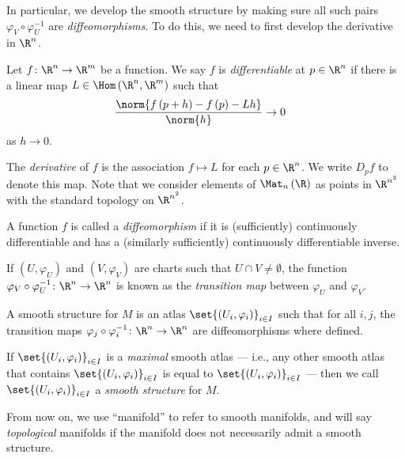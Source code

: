 \documentclass[10pt]{mypackage}
\begin{document}
In particular, we develop the smooth structure by making sure all such pairs $\varphi_{V}\circ\varphi_U^{-1}$ are \textit{diffeomorphisms}. To do this, we need to first develop the derivative in $\R^n$.
\begin{definition}
  Let $f\colon \R^n\rightarrow \R^m$ be a function. We say $f$ is \textit{differentiable} at $p\in \R^n$ if there is a linear map $L\in \Hom\left( \R^n,\R^m \right)$ such that
  \begin{align*}
    \frac{\norm{f\left( p+h \right)-f\left( p \right)-Lh}}{\norm{h}} &\rightarrow 0
  \end{align*}
  as $h\rightarrow 0$.\newline

  The \textit{derivative} of $f$ is the association $f\mapsto L$ for each $p\in \R^n$. We write $D_pf$ to denote this map. Note that we consider elements of $\Mat_{n}\left( \R \right)$ as points in $\R^{n^2}$ with the standard topology on $\R^{n^2}$.\newline

  A function $f$ is called a \textit{diffeomorphism} if it is (sufficiently) continuously differentiable and has a (similarly sufficiently) continuously differentiable inverse.
\end{definition}
\begin{definition}
  If $\left( U,\varphi_U \right)$ and $\left( V,\varphi_V \right)$ are charts such that $U\cap V \neq \emptyset$, the function $\varphi_{V}\circ \varphi_{U}^{-1}\colon \R^n\rightarrow \R^n$ is known as the \textit{transition map} between $\varphi_U$ and $\varphi_V$.\newline

  A smooth structure for $M$ is an atlas $\set{\left( U_i,\varphi_i \right)}_{i\in I}$ such that for all $i,j$, the transition maps $\varphi_j\circ \varphi_i^{-1}\colon \R^n\rightarrow \R^n$ are diffeomorphisms where defined.\newline

  If $\set{\left( U_i,\varphi_i \right)}_{i\in I}$ is a \textit{maximal} smooth atlas --- i.e., any other smooth atlas that contains $\set{\left( U_i,\varphi_i \right)}_{i\in I}$ is equal to $\set{\left( U_i,\varphi_i \right)}_{i\in I}$ --- then we call $\set{\left( U_i,\varphi_i \right)}_{i\in I}$ a \textit{smooth structure} for $M$.
\end{definition}
\begin{note}
  From now on, we use ``manifold'' to refer to smooth manifolds, and will say \textit{topological} manifolds if the manifold does not necessarily admit a smooth structure.
\end{note}
\end{document}
